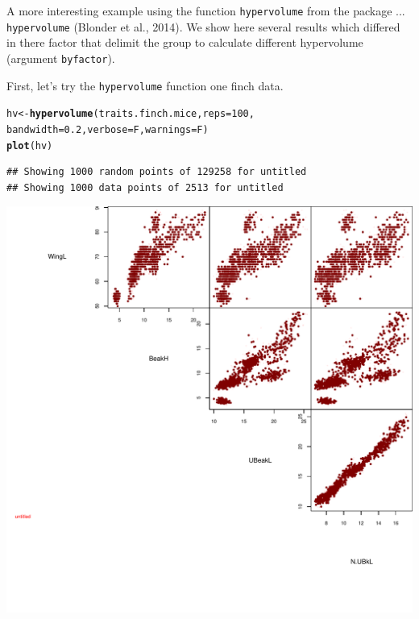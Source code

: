 \documentclass[12pt]{article}\usepackage[]{graphicx}\usepackage[]{color}
\makeatletter
\def\maxwidth{ %
  \ifdim\Gin@nat@width>\linewidth
    \linewidth
  \else
    \Gin@nat@width
  \fi
}
\newcommand{\hlnum}[1]{\textcolor[rgb]{0.686,0.059,0.569}{#1}}%
\newcommand{\hlstd}[1]{\textcolor[rgb]{0.345,0.345,0.345}{#1}}%
\newcommand{\hlkwb}[1]{\textcolor[rgb]{0.69,0.353,0.396}{#1}}%
\newcommand{\hlkwc}[1]{\textcolor[rgb]{0.333,0.667,0.333}{#1}}%
\newcommand{\hlkwd}[1]{\textcolor[rgb]{0.737,0.353,0.396}{\textbf{#1}}}%
\newenvironment{kframe}{%
 \def\at@end@of@kframe{}%
 \ifinner\ifhmode%
  \def\at@end@of@kframe{\end{minipage}}%
  \begin{minipage}{\columnwidth}%
 \fi\fi%
 \def\FrameCommand##1{\hskip\@totalleftmargin \hskip-\fboxsep
 \colorbox{shadecolor}{##1}\hskip-\fboxsep
     \hskip-\linewidth \hskip-\@totalleftmargin \hskip\columnwidth}%
 \MakeFramed {\advance\hsize-\width
   \@totalleftmargin\z@ \linewidth\hsize
   \@setminipage}}%
 {\par\unskip\endMakeFramed%
 \at@end@of@kframe}
\newenvironment{knitrout}{}{} %
\makeatother
\begin{document}
\newpage
A more interesting example using the function \texttt{hypervolume} from the package ... \texttt{hypervolume} (Blonder et al., 2014). We show here several results which differed in there factor that delimit the group to calculate different hypervolume (argument \texttt{byfactor}). 

First, let's try the \texttt{hypervolume} function one finch data.
\begin{knitrout}
\color{fgcolor}\begin{kframe}
\begin{alltt}
\hlstd{hv}\hlkwb{<-}\hlkwd{hypervolume}\hlstd{(traits.finch.mice,} \hlkwc{reps} \hlstd{=} \hlnum{100}\hlstd{,}
                \hlkwc{bandwidth} \hlstd{=} \hlnum{0.2}\hlstd{,} \hlkwc{verbose} \hlstd{= F,} \hlkwc{warnings} \hlstd{= F)}
\hlkwd{plot}\hlstd{(hv)}
\end{alltt}
\begin{verbatim}
## Showing 1000 random points of 129258 for untitled
## Showing 1000 data points of 2513 for untitled
\end{verbatim}
\end{kframe}
\includegraphics[width=\maxwidth]{figure/unnamed-chunk-55-1} 

\end{knitrout}
\end{document}

